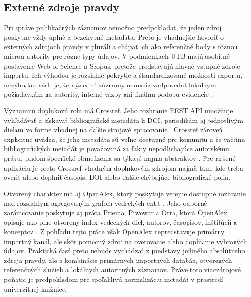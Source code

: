 \subsection{Externé zdroje pravdy}

Pri správe publikačných záznamov nemožno predpokladať, že jeden zdroj poskytne vždy úplné a bezchybné metadáta. Preto je vhodnejšie hovoriť o externých zdrojoch pravdy v pluráli a chápať ich ako referenčné body s rôznou mierou autority pre rôzne typy údajov. V podmienkach UTB majú osobitné postavenie Web of Science a Scopus, pretože predstavujú hlavné vstupné zdroje importu. Ich výhodou je rozsiahle pokrytie a štandardizované možnosti exportu, nevýhodou však je, že výsledné záznamy nemusia zodpovedať lokálnym požiadavkám na autority, interné väzby ani finálnu podobu evidencie \cite{ClarivateWOSExport,ScopusSupport}.

Významnú doplnkovú rolu má Crossref. Jeho rozhranie REST API umožňuje vyhľadávať a získavať bibliografické metadáta k DOI, periodikám aj jednotlivým dielam vo forme vhodnej na ďalšie strojové spracovanie \cite{CrossrefRESTAPI}. Crossref zároveň explicitne uvádza, že jeho metadáta sú voľne dostupné pre komunitu a že väčšina bibliografických metadát je považovaná za fakty nepodliehajúce autorskému právu, pričom špecifické obmedzenia sa týkajú najmä abstraktov \cite{CrossrefMetadataRetrieval}. Pre riešenú aplikáciu je preto Crossref vhodným doplnkovým zdrojom najmä tam, kde treba overiť alebo doplniť časopis, DOI alebo ďalšie chýbajúce bibliografické polia.

Otvorený charakter má aj OpenAlex, ktorý poskytuje verejne dostupné rozhranie nad rozsiahlym agregovaným grafom vedeckých entít \cite{OpenAlexDocs}. Jeho odborné zarámcovanie poskytuje aj práca Priema, Piwowar a Orra, ktorá OpenAlex opisuje ako plne otvorený index vedeckých diel, autorov, časopisov, inštitúcií a konceptov \cite{OpenAlexPaper}. Z pohľadu tejto práce však OpenAlex nepredstavuje primárny importný kanál, ale skôr pomocný zdroj na overovanie alebo dopĺňanie vybraných údajov. Praktická časť preto nebude vychádzať z predstavy jediného absolútneho zdroja pravdy, ale z kombinácie primárnych importných databáz, otvorených referenčných služieb a lokálnych autoritných záznamov. Práve toto viaczdrojové poňatie je predpokladom pre spoľahlivú normalizáciu metadát v prostredí univerzitnej knižnice.
